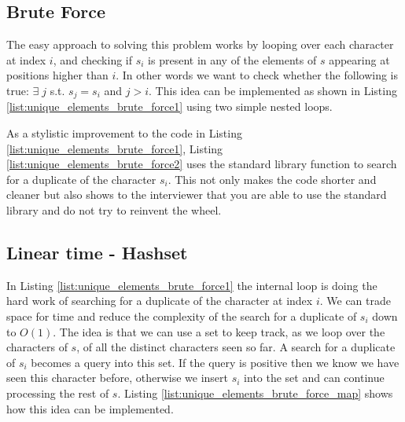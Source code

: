 \subsection{Brute Force}
The easy approach to solving this problem works by looping over each character at index $i$,
and checking if $s_i$ is present in any of the elements  of $s$ appearing at positions higher than $i$. 
In other words we want to check whether the following is true: $\exists \; j $ s.t.  $s_j=s_i$ and $j>i$.
This idea can be implemented as shown in
Listing \ref{list:unique_elements_brute_force1} using two simple nested loops.




As a stylistic improvement to the code in Listing \ref{list:unique_elements_brute_force1}, Listing
\ref{list:unique_elements_brute_force2}  uses the \CC standard library function  to
search for a duplicate of the character $s_i$. 
This not only makes the code shorter and cleaner
but also shows to the interviewer that you are able to use the standard library and do not try to reinvent the wheel.



\subsection{Linear time - Hashset}
In Listing \ref{list:unique_elements_brute_force1} the internal loop is doing the hard work of
searching for a duplicate of the character at index $i$. We can trade space for time and reduce the
complexity of the  search for a duplicate of $s_i$ down to $O(1)$.
The idea is that we can use a set to keep track, as we loop over the characters of $s$, of all the distinct characters seen so far.
A search for a duplicate of $s_i$ becomes a query into this set. If the query is positive then we know we have seen this character before, otherwise 
we insert $s_i$ into the set and can continue  processing the rest of $s$.
Listing \ref{list:unique_elements_brute_force_map} shows how this idea can be implemented.





